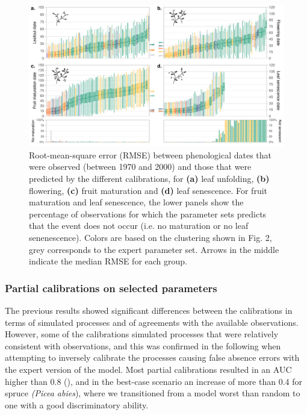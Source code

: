 \begin{figure}[htpb]
\hspace*{-1cm}
\centering
\begin{subcaptiongroup}
\label{fig:3A} 
\label{fig:3B}
\label{fig:3C}
\label{fig:3D}
\label{fig:3E}
\end{subcaptiongroup}
\includegraphics{chapter3/figs/fig4-1.pdf}
\caption{Root-mean-square error (RMSE) between phenological dates that were observed (between 1970 and 2000) and those that were predicted by the different calibrations, for \textbf{(a)} leaf unfolding, \textbf{(b)} flowering, \textbf{(c)} fruit maturation and \textbf{(d)} leaf senescence. For fruit maturation and leaf senescence, the lower panels show the percentage of observations for which the parameter sets predicts that the event does not occur (i.e. no maturation or no leaf senenescence). Colors are based on the clustering shown in Fig. 2, grey corresponds to the expert parameter set. Arrows in the middle indicate the median RMSE for each group.}
\label{fig:3}
\end{figure}

\subsubsection{Partial calibrations on selected parameters}

The previous results showed significant differences between the calibrations in terms of simulated processes and of agreements with the available observations. However, some of the calibrations simulated processes that were relatively consistent with observations, and this was confirmed in the following when attempting to inversely calibrate the processes causing false absence errors with the expert version of the model. Most partial calibrations resulted in an AUC higher than 0.8 (), and in the best-case scenario an increase of more than 0.4 for spruce \emph{(Picea abies}), where we transitioned from a model worst than random to one with a good discriminatory ability.


